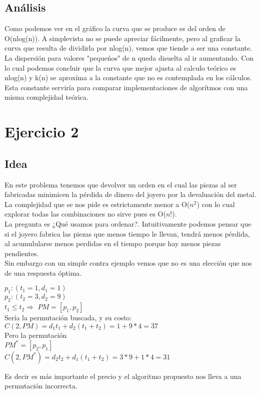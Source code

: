 \documentclass[11pt,a4paper]{article}
\newcommand{\bc}{\begin{center}}
\newcommand{\ec}{\end{center}}
\begin{document}
\subsection{An\'alisis}

Como podemos ver en el gr\'afico la curva que se produce es del orden de O(nlog(n)). A simplevista no se puede apreciar f\'acilmente, pero al graficar la curva que resulta de dividirla por nlog(n), vemos que tiende a ser una constante. La dispersi\'on para valores "peque\'nos" de n queda disuelta al ir aumentando. Con lo cual podemos concluir que la curva que mejor ajusta al calculo te\'orico es nlog(n) y k(n) se aprox\'ima a la constante que no es contemplada en los c\'alculos. Esta constante servir\'ia para comparar implementaciones de algor\'itmos con una misma complejidad te\'orica.



\section{Ejercicio 2}

\subsection{Idea}

En este problema tenemos que devolver un orden en el cual las piezas al ser fabricadas minimicen la pérdida de dinero del joyero por la devaluación del metal.\\
La complejidad que se nos pide es estrictamente menor a O($n^2$) con lo cual explorar todas las combinaciones no sirve pues es O($n!$).\\
La pregunta es ¿Qué usamos para ordenar?.
Intuitivamente podemos pensar que si el joyero fabrica las piezas que menos tiempo le llevan, tendrá menos pérdida, al acumulularse menos perdidas en el tiempo porque hay menos piezas pendientes.\\
Sin embargo con un simple contra ejemplo vemos que no es una elección que nos de una respuesta óptima.\\
\bc
$p_1 : (t_1 = 1, d_1 = 1)$\\
$p_2 : (t_2 = 3, d_2 = 9)$\\
$t_1 \le t_2  \Rightarrow$ $PM = [p_1, p_2]$\\
Sería la permutación buscada, y su costo:\\
$C(2, PM) = d_1t_1 + d_2(t_1+t_2) = 1 + 9*4 = 37$\\
Pero la permutación \\
$PM^* = [p_2, p_1]$\\
$C(2, PM^*) = d_2t_2 + d_1(t_1+t_2) = 3*9 + 1*4 = 31$\\
\ec
Es decir es más importante el precio y el algoritmo propuesto nos lleva a una permutación incorrecta. 
\end{document}
